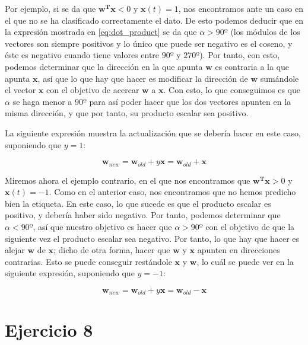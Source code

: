 \documentclass[11pt,a4paper]{article}
\begin{document}
Por ejemplo, si se da que $\mathbf{w^\textbf{T}\mathbf{x}} < 0$ y $\mathbf{x}(t) = 1$, nos encontramos ante un caso en el que
no se ha clasificado correctamente el dato. De esto podemos deducir que en la expresión mostrada en \eqref{eq:dot_product} se
da que $\alpha > 90º$ (los módulos de los vectores son siempre positivos y lo único que puede ser
negativo es el coseno, y éste es negativo cuando tiene valores entre $90º$ y  $270º$). Por tanto, con esto, podemos determinar
que la dirección en la que apunta $\mathbf{w}$ es contraria a la que apunta $\mathbf{x}$, así que lo que hay que hacer
es modificar la dirección de $\mathbf{w}$ sumándole el vector $\mathbf{x}$ con el objetivo de acercar $\mathbf{w}$ a
$\mathbf{x}$. Con esto, lo que conseguimos es que $\alpha$ se haga menor a $90º$ para así poder hacer que los dos vectores
apunten en la misma dirección, y que por tanto, su producto escalar sea positivo. 

La siguiente expresión muestra la actualización que se debería hacer en este caso, suponiendo que $y = 1$:

\begin{equation}
	\mathbf{w}_{new} = \mathbf{w}_{old} + y\mathbf{x} = \mathbf{w}_{old} + \mathbf{x}
\end{equation}

Miremos ahora el ejemplo contrario, en el que nos encontramos que $\mathbf{w^\textbf{T}\mathbf{x}} > 0$ y
$\mathbf{x}(t) = -1$. Como en el anterior caso, nos encontramos que no hemos predicho bien la etiqueta. En este caso, lo que
sucede es que el producto escalar es positivo, y debería haber sido negativo. Por tanto, podemos determinar que
$\alpha < 90º$, así que nuestro objetivo es hacer que $\alpha > 90º$ con el objetivo de que la siguiente vez el producto
escalar sea negativo. Por tanto, lo que hay que hacer es alejar $\mathbf{w}$ de $\mathbf{x}$; dicho de otra forma, hacer que 
$\mathbf{w}$ y $\mathbf{x}$ apunten en direcciones contrarias. Esto se puede conseguir restándole $\mathbf{x}$ y $\mathbf{w}$,
lo cuál se puede ver en la siguiente expresión, suponiendo que $y = -1$:

\begin{equation}
	\mathbf{w}_{new} = \mathbf{w}_{old} + y\mathbf{x} = \mathbf{w}_{old} - \mathbf{x}
\end{equation}

\section*{Ejercicio 8}
\end{document}
